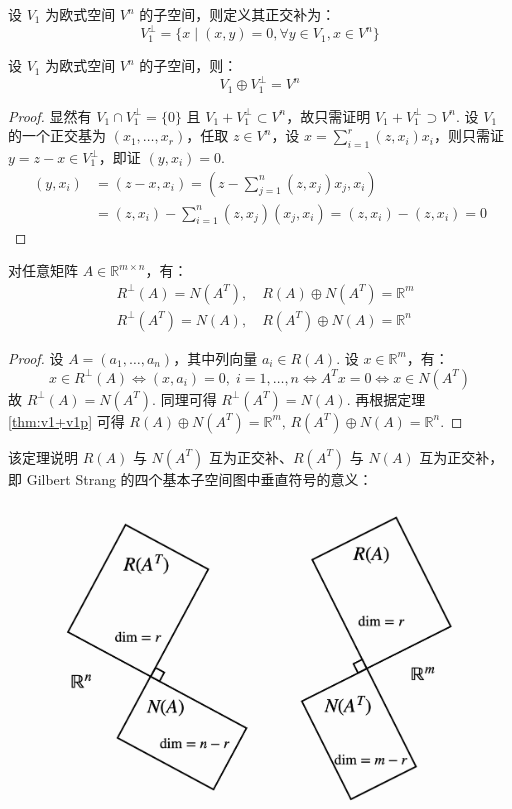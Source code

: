 \begin{definition}[正交补]
设 $V_1$ 为欧式空间 $V^n$ 的子空间，则定义其正交补为：
\[V_1^{\perp}=\{x\mid(x,y)=0,\forall y\in V_1,x\in V^n\}\]
\end{definition}

\begin{theorem}
\label{thm:v1+v1p}
设 $V_1$ 为欧式空间 $V^n$ 的子空间，则：
\[V_1\oplus V_1^{\perp}=V^n\]
\end{theorem}
\begin{proof}
显然有 $V_1\cap V_1^{\perp}=\{0\}$ 且 $V_1+V_1^{\perp}\subset V^n$，故只需证明 $V_1+V_1^{\perp}\supset V^n$.
设 $V_1$ 的一个正交基为 $(x_1,\ldots,x_r)$，任取 $z\in V^n$，设 $x=\sum_{i=1}^r(z,x_i)x_i$，则只需证 $y=z-x\in V_1^{\perp}$，即证 $(y,x_i)=0$.
\begin{align*}
    (y,x_i)&=(z-x,x_i)=\left(z-\sum_{j=1}^n(z,x_j)x_j,x_i\right)\\
    &=(z,x_i)-\sum_{i=1}^n(z,x_j)(x_j,x_i)=(z,x_i)-(z,x_i)=0
\end{align*}
\end{proof}

\begin{theorem}
对任意矩阵 $A\in\mathbb R^{m\times n}$，有：
\begin{align*}
    &R^{\perp}(A)=N(A^T),\quad R(A)\oplus N(A^T)=\mathbb R^m\\
    &R^{\perp}(A^T)=N(A),\quad R(A^T)\oplus N(A)=\mathbb R^n
\end{align*}
\end{theorem}
\begin{proof}
设 $A=(a_1,\ldots,a_n)$，其中列向量 $a_i\in R(A)$. 设 $x\in\mathbb R^m$，有：
\[
    x\in R^{\perp}(A) \iff (x,a_i)=0,\;i=1,\ldots,n \iff A^Tx=0 \iff x\in N(A^T)
\]
故 $R^{\perp}(A)=N(A^T)$. 同理可得 $R^{\perp}(A^T)=N(A)$. 再根据定理 \ref{thm:v1+v1p} 可得 $R(A)\oplus N(A^T)=\mathbb R^m,\,R(A^T)\oplus N(A)=\mathbb R^n$.
\end{proof}
\begin{remark}
该定理说明 $R(A)$ 与 $N(A^T)$ 互为正交补、$R(A^T)$ 与 $N(A)$ 互为正交补，即 Gilbert Strang 的四个基本子空间图中垂直符号的意义：
\begin{figure}[H]
    \centering
    \includegraphics[width=0.55\linewidth]{figs/spaces.png}
\end{figure}
\end{remark}

